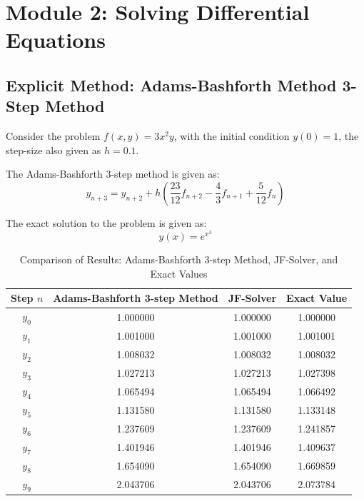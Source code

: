 \section{Module 2: Solving Differential Equations}

\subsection{Explicit Method: Adams-Bashforth Method 3-Step Method}
Consider the problem $f(x,y) = 3x^2y$, with the initial condition $y(0) = 1$, the step-size also given as $h = 0.1$.

The Adams-Bashforth 3-step method is given as:
\begin{equation}
    y_{n+3}  = y_{n+2} + h \left(\frac{23}{12}f_{n+2} - \frac{4}{3}f_{n+1} + \frac{5}{12}f_{n}\right)
\end{equation}

The exact solution to the problem is given as:
\begin{equation}
    y(x) = e^{x^3}
\end{equation}




\begin{table}[htbp]
    \centering
    \begin{tabular}{|c|c|c|c|}
        \hline
        Step $n$ & Adams-Bashforth 3-step Method & JF-Solver & Exact Value \\
        \hline
        $y_0$ & 1.000000 & 1.000000 & 1.000000 \\
        $y_1$ & 1.001000 & 1.001000 & 1.001001 \\
        $y_2$ & 1.008032 & 1.008032 & 1.008032 \\
        $y_3$ & 1.027213 & 1.027213 & 1.027398 \\
        $y_4$ & 1.065494 & 1.065494 & 1.066492 \\
        $y_5$ & 1.131580 & 1.131580 & 1.133148 \\
        $y_6$ & 1.237609 & 1.237609 & 1.241857 \\
        $y_7$ & 1.401946 & 1.401946 & 1.409637 \\
        $y_8$ & 1.654090 & 1.654090 & 1.669859 \\
        $y_9$ & 2.043706 & 2.043706 & 2.073784 \\
        \hline
    \end{tabular}
    \caption{Comparison of Results: Adams-Bashforth 3-step Method, JF-Solver, and Exact Values}
    \label{tab:comparison}
\end{table}


